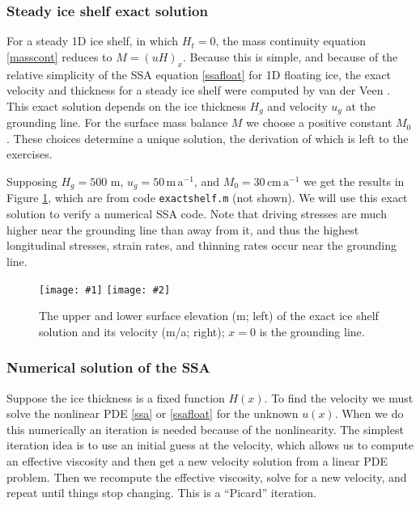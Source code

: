 \documentclass[letterpaper,final,12pt,reqno]{amsart}
\newcommand{\twofigsizes}[5]{
\begin{figure}[ht]
\centering
\texttt{[image: \#1]} \quad
\texttt{[image: \#2]}
\caption{#3}
\label{fig:#1}
\end{figure}}
\newcommand{\twofig}[3]{\twofigsizes{#1}{#2}{#3}{2.5in}{2.5in}}
\begin{document}
\subsubsection*{Steady ice shelf exact solution}  For a steady 1D ice shelf, in which $H_t=0$, the mass continuity equation \eqref{masscont} reduces to $M=(uH)_x$.  Because this is simple, and because of the relative simplicity of the SSA equation \eqref{ssafloat} for 1D floating ice, the exact velocity and thickness for a steady ice shelf were computed by van der Veen  \cite{vanderVeen83}.  This exact solution depends on the ice thickness $H_g$ and velocity $u_g$ at the grounding line.  For the surface mass balance $M$ we choose a positive constant $M_0$.  These choices determine a unique solution, the derivation of which is left to the exercises.

Supposing $H_g=500$ m, $u_g = 50 \,\text{m}\,\text{a}^{-1}$, and $M_0=30 \,\text{cm}\,\text{a}^{-1}$ we get the results in Figure \ref{fig:steadyshelfprofile}, which are from code \texttt{exactshelf.m} (not shown).  We will use this exact solution to verify a numerical SSA code.  Note that driving stresses are much higher near the grounding line than away from it, and thus the highest longitudinal stresses, strain rates, and thinning rates occur near the grounding line.

\twofig{steadyshelfprofile}{steadyshelfvelocity}{The upper and lower surface elevation (m; left) of the exact ice shelf solution and its velocity (m/a; right); $x=0$ is the grounding line.}

\subsubsection*{Numerical solution of the SSA}  Suppose the ice thickness is a fixed function $H(x)$.  To find the velocity we must solve the nonlinear PDE \eqref{ssa} or \eqref{ssafloat} for the unknown $u(x)$.  When we do this numerically an iteration is needed because of the nonlinearity.  The simplest iteration idea is to use an initial guess at the velocity, which allows us to compute an effective viscosity and then get a new velocity solution from a linear PDE problem.  Then we recompute the effective viscosity, solve for a new velocity, and repeat until things stop changing.  This is a ``Picard'' iteration.
\end{document}
